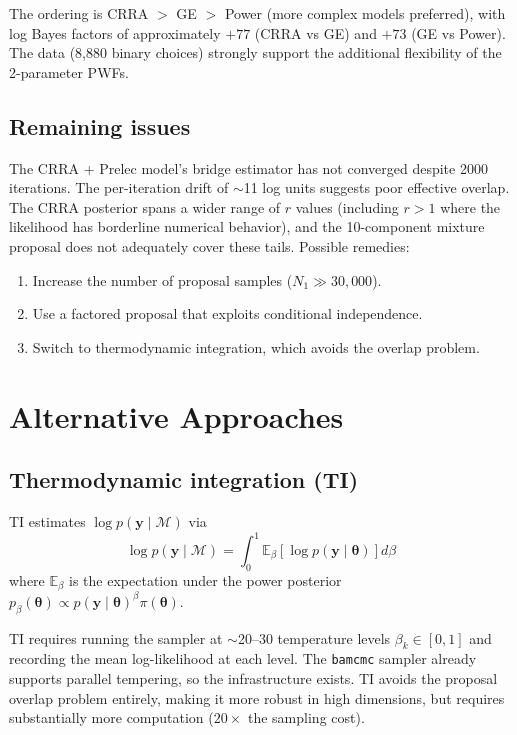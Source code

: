 \documentclass[11pt]{article}
\newcommand{\E}{\mathbb{E}}
\newcommand{\bth}{\boldsymbol{\theta}}
\newcommand{\by}{\mathbf{y}}
\newcommand{\cM}{\mathcal{M}}
\theoremstyle{plain}
\theoremstyle{definition}
\begin{document}
The ordering is CRRA $>$ GE $>$ Power (more complex models preferred),
with log Bayes factors of approximately $+77$ (CRRA vs GE) and $+73$
(GE vs Power). The data (8,880 binary choices) strongly support the
additional flexibility of the 2-parameter PWFs.

\subsection{Remaining issues}

The CRRA + Prelec model's bridge estimator has not converged despite
2000 iterations. The per-iteration drift of $\sim$11 log units suggests
poor effective overlap. The CRRA posterior spans a wider range of $r$ values
(including $r > 1$ where the likelihood has borderline numerical behavior),
and the 10-component mixture proposal does not adequately cover these
tails. Possible remedies:
\begin{enumerate}
  \item Increase the number of proposal samples ($N_1 \gg 30{,}000$).
  \item Use a factored proposal that exploits conditional independence.
  \item Switch to thermodynamic integration, which avoids the overlap problem.
\end{enumerate}


\section{Alternative Approaches}

\subsection{Thermodynamic integration (TI)}

TI estimates $\log p(\by \mid \cM)$ via
\begin{equation}
  \log p(\by \mid \cM) = \int_0^1 \E_\beta\!\left[\log p(\by \mid \bth)\right] d\beta
\end{equation}
where $\E_\beta$ is the expectation under the power posterior
$p_\beta(\bth) \propto p(\by \mid \bth)^\beta \pi(\bth)$.

TI requires running the sampler at $\sim$20--30 temperature levels
$\beta_k \in [0, 1]$ and recording the mean log-likelihood at each level.
The \texttt{bamcmc} sampler already supports parallel tempering, so the
infrastructure exists. TI avoids the proposal overlap problem entirely,
making it more robust in high dimensions, but requires substantially more
computation ($20\times$ the sampling cost).
\end{document}
